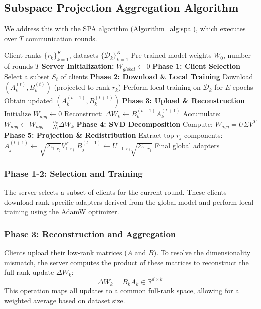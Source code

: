 \documentclass[conference]{IEEEtran}
\begin{document}
\subsection{Subspace Projection Aggregation Algorithm}

We address this with the SPA algorithm (Algorithm~\ref{alg:spa}), which executes over $T$ communication rounds.

\begin{algorithm}[t]
\caption{Subspace Projection Aggregation (SPA)}
\label{alg:spa}
\small
\begin{algorithmic}[1]
\REQUIRE Client ranks $\{r_k\}_{k=1}^K$, datasets $\{\mathcal{D}_k\}_{k=1}^K$
\REQUIRE Pre-trained model weights $W_0$, number of rounds $T$
\STATE \textbf{Server Initialization:} $W_{global} \leftarrow 0$
    \STATE \textbf{Phase 1: Client Selection}
    \STATE Select a subset $S_t$ of clients
    \STATE \textbf{Phase 2: Download \& Local Training}
        \STATE Download $(A_k^{(t)}, B_k^{(t)})$ (projected to rank $r_k$)
        \STATE Perform local training on $\mathcal{D}_k$ for $E$ epochs
        \STATE Obtain updated $(A_k^{(t+1)}, B_k^{(t+1)})$
    \ENDFOR
    \STATE \textbf{Phase 3: Upload \& Reconstruction}
    \STATE Initialize $W_{agg} \leftarrow 0$
        \STATE Reconstruct: $\Delta W_k \leftarrow B_k^{(t+1)} A_k^{(t+1)}$
        \STATE Accumulate: $W_{agg} \leftarrow W_{agg} + \frac{n_k}{N_t} \Delta W_k$
    \ENDFOR
    \STATE \textbf{Phase 4: SVD Decomposition}
    \STATE Compute: $W_{agg} = U \Sigma V^T$
    \STATE \textbf{Phase 5: Projection \& Redistribution}
        \STATE Extract top-$r_j$ components:
        \STATE $A_j^{(t+1)} \leftarrow \sqrt{\Sigma_{1:r_j}} V^T_{1:r_j}$
        \STATE $B_j^{(t+1)} \leftarrow U_{:,1:r_j} \sqrt{\Sigma_{1:r_j}}$
    \ENDFOR
\ENDFOR
\RETURN Final global adapters
\end{algorithmic}
\end{algorithm}

\subsubsection{Phase 1-2: Selection and Training}
The server selects a subset of clients for the current round. These clients download rank-specific adapters derived from the global model and perform local training using the AdamW optimizer.

\subsubsection{Phase 3: Reconstruction and Aggregation}
Clients upload their low-rank matrices ($A$ and $B$). To resolve the dimensionality mismatch, the server computes the product of these matrices to reconstruct the full-rank update $\Delta W_k$:
\begin{equation}
\Delta W_k = B_k A_k \in \mathbb{R}^{d \times k}
\end{equation}
This operation maps all updates to a common full-rank space, allowing for a weighted average based on dataset size.
\end{document}
